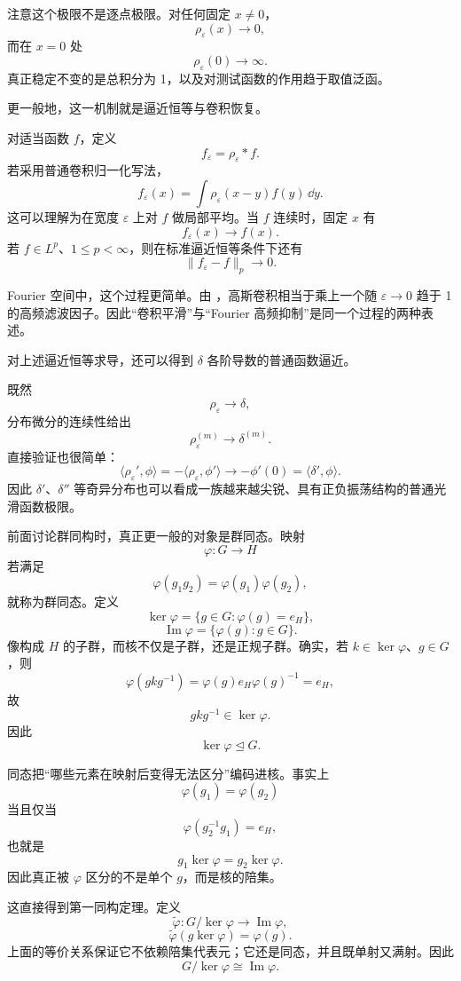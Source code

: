 注意这个极限不是逐点极限。对任何固定 $x\neq0$，
\[
\rho_\varepsilon(x)\to0,
\]
而在 $x=0$ 处
\[
\rho_\varepsilon(0)\to\infty.
\]
真正稳定不变的是总积分为 1，以及对测试函数的作用趋于取值泛函。

更一般地，这一机制就是逼近恒等与卷积恢复。

对适当函数 $f$，定义
\[
f_\varepsilon=\rho_\varepsilon*f.
\]
若采用普通卷积归一化写法，
\[
f_\varepsilon(x)
=\int\rho_\varepsilon(x-y)f(y)\,\dd y.
\]
这可以理解为在宽度 $\varepsilon$ 上对 $f$ 做局部平均。当 $f$ 连续时，固定 $x$ 有
\[
f_\varepsilon(x)\to f(x).
\]
若 $f\in L^p$、$1\le p<\infty$，则在标准逼近恒等条件下还有
\[
\|f_\varepsilon-f\|_p\to0.
\]

Fourier 空间中，这个过程更简单。由 ，高斯卷积相当于乘上一个随 $\varepsilon\to0$ 趋于 1 的高频滤波因子。因此“卷积平滑”与“Fourier 高频抑制”是同一个过程的两种表述。

对上述逼近恒等求导，还可以得到 $\delta$ 各阶导数的普通函数逼近。

既然
\[
\rho_\varepsilon\to\delta,
\]
分布微分的连续性给出
\[
\rho_\varepsilon^{(m)}\to\delta^{(m)}.
\]
直接验证也很简单：
\[
\langle\rho_\varepsilon',\phi\rangle
=-\langle\rho_\varepsilon,\phi'\rangle
\longrightarrow-\phi'(0)
=\langle\delta',\phi\rangle.
\]
因此 $\delta'$、$\delta''$ 等奇异分布也可以看成一族越来越尖锐、具有正负振荡结构的普通光滑函数极限。

前面讨论群同构时，真正更一般的对象是群同态。映射
\[
\varphi:G\to H
\]
若满足
\[
\varphi(g_1g_2)=\varphi(g_1)\varphi(g_2),
\]
就称为群同态。定义
\[
\ker\varphi=
\{g\in G:\varphi(g)=e_H\},
\]
\[
\operatorname{Im}\varphi
=\{\varphi(g):g\in G\}.
\]
像构成 $H$ 的子群，而核不仅是子群，还是正规子群。确实，若 $k\in\ker\varphi$、$g\in G$，则
\[
\varphi(gkg^{-1})
=\varphi(g)e_H\varphi(g)^{-1}=e_H,
\]
故
\[
gkg^{-1}\in\ker\varphi.
\]
因此
\[
\boxed{\ker\varphi\trianglelefteq G}.
\]

同态把“哪些元素在映射后变得无法区分”编码进核。事实上
\[
\varphi(g_1)=\varphi(g_2)
\]
当且仅当
\[
\varphi(g_2^{-1}g_1)=e_H,
\]
也就是
\[
g_1\ker\varphi=g_2\ker\varphi.
\]
因此真正被 $\varphi$ 区分的不是单个 $g$，而是核的陪集。

这直接得到第一同构定理。定义
\[
\widetilde\varphi:G/\ker\varphi
\longrightarrow \operatorname{Im}\varphi,
\]
\[
\widetilde\varphi(g\ker\varphi)=\varphi(g).
\]
上面的等价关系保证它不依赖陪集代表元；它还是同态，并且既单射又满射。因此
\begin{equation*}\boxed{
G/\ker\varphi\cong\operatorname{Im}\varphi
}.\end{equation*}


